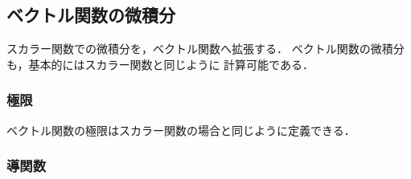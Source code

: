     \subsection{ベクトル関数の微積分}
    \begin{mycomment}
        スカラー関数での微積分を，ベクトル関数へ拡張する．
        ベクトル関数の微積分も，基本的にはスカラー関数と同じように
        計算可能である．
    \end{mycomment}

    \subsubsection{極限}
    ベクトル関数の極限はスカラー関数の場合と同じように定義できる．

    \subsubsection{導関数}





